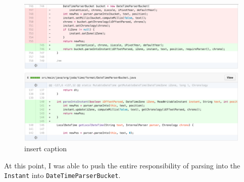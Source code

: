 \begin{figure}[H]
	\centering
	\includegraphics[width=\linewidth]{code55}
	\caption{insert caption}
\end{figure}

At this point, I was able to push the entire responsibility of parsing into the \texttt{Instant} into \texttt{DateTimeParserBucket}.

